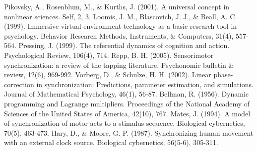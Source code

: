 \documentclass[12pt]{article}
\begin{document}
\begin{thebibliography}{}
    Pikovsky, A., Rosenblum, M., \& Kurths, J. (2001). A universal concept in nonlinear sciences. Self, 2, 3.
    Loomis, J. M., Blascovich, J. J., \& Beall, A. C. (1999). Immersive virtual environment technology as a basic research tool in psychology. Behavior Research Methods, Instruments, \& Computers, 31(4), 557-564.
    Pressing, J. (1999). The referential dynamics of cognition and action. Psychological Review, 106(4), 714.
    Repp, B. H. (2005). Sensorimotor synchronization: a review of the tapping literature. Psychonomic bulletin \& review, 12(6), 969-992.
    Vorberg, D., \& Schulze, H. H. (2002). Linear phase-correction in synchronization: Predictions, parameter estimation, and simulations. Journal of Mathematical Psychology, 46(1), 56-87.
    Bellman, R. (1956). Dynamic programming and Lagrange multipliers. Proceedings of the National Academy of Sciences of the United States of America, 42(10), 767.
    Mates, J. (1994). A model of synchronization of motor acts to a stimulus sequence. Biological cybernetics, 70(5), 463-473.
    Hary, D., \& Moore, G. P. (1987). Synchronizing human movement with an external clock source. Biological cybernetics, 56(5-6), 305-311.
\end{thebibliography}
\end{document}
